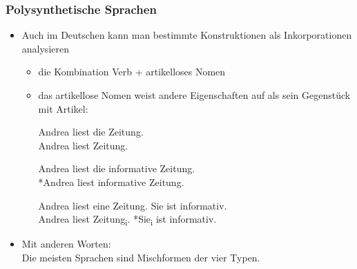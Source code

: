 \begin{frame}
\frametitle{Polysynthetische Sprachen}

\begin{itemize}
	\item Auch im Deutschen kann man bestimmte Konstruktionen als Inkorporationen analysieren
	
	\begin{itemize}
		\item die Kombination Verb + artikelloses Nomen
		\item das artikellose Nomen weist andere Eigenschaften auf als sein Gegenstück mit Artikel:
		
		\ea Andrea liest die Zeitung. \\
			 Andrea liest Zeitung.
		\z
			 
		\ea Andrea liest die informative Zeitung. \\
			 *Andrea liest informative Zeitung.
		\z
			 
		\ea Andrea liest eine Zeitung. Sie ist informativ. \\
			 Andrea liest Zeitung\textsubscript{i}. *Sie\textsubscript{i} ist informativ.
		\z
			 
	\end{itemize}
	\item Mit anderen Worten: \\
		Die meisten Sprachen sind Mischformen der vier Typen.
\end{itemize}


\end{frame}

